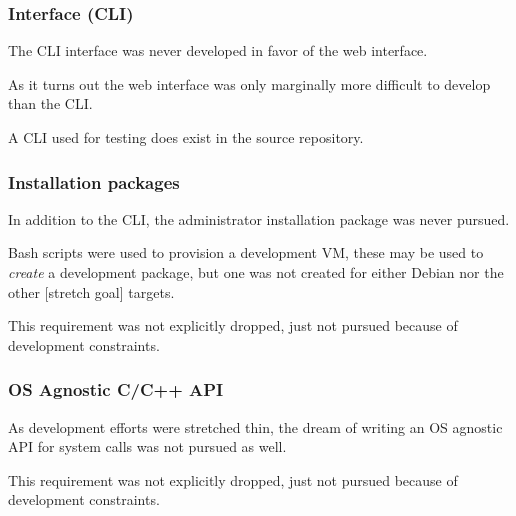 \subsubsection{Interface (CLI)}

The CLI interface was never developed in favor of the web interface.

As it turns out the web interface was only marginally more difficult to develop than the CLI.

A CLI used for testing does exist in the source repository.

\subsubsection{Installation packages}

In addition to the CLI, the administrator installation package was never pursued.

Bash scripts were used to provision a development VM, these may be used to \textit{create} a development package, but one was not created for either Debian nor the other [stretch goal] targets.

This requirement was not explicitly dropped, just not pursued because of development constraints.

\subsubsection{OS Agnostic C/C++ API}

As development efforts were stretched thin, the dream of writing an OS agnostic API for system calls was not pursued as well.

This requirement was not explicitly dropped, just not pursued because of development constraints.
